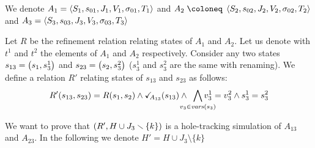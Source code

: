 \documentclass[runningheads]{llncs}
\begin{document}
We denote $A_1=  \left<S_1,s_{01},J_1,V_1,\sigma_{01},T_1\right>$ and \(A_2 \defobject \OA{S_2}{s_{02}}{J_2}{V_2}{\sigma_{02}}{T_2}\) and $A_3 = \left<S_3,s_{03},J_3,V_3,\sigma_{03},T_3\right>$

Let $R$ be the refinement relation relating states of $A_1$ and $A_2$. 
Let us denote with $t^1$ and $t^2$  the elements of $A_1$ and $A_2$ respectively.
Consider any two states $s_{13} = {\left(s_1,s^1_3\right)}$ and $s_{23} = {\left(s_2,s^2_3\right)}$ ($s^1_3$ and $s^2_3$  are the same with renaming). We define a relation $R'$ relating states of $s_{13}$ and $s_{23}$ as follows:
\[ R' \mpar{s_{13}, s_{23}} = R\mpar{s_{1}, s_{2}} \wedge \reach{A_{13}}\mpar{s_{13}} \wedge \bigwedge_\subbox{v_3\in \fvars{s_{3}}
}\!\!\! v^1_3=v^2_3\wedge s^1_3 = s^2_3\]


We want to prove that ${\left(R', H\cup J_3 \smallsetminus\{k\}\right)}$ is a hole-tracking simulation of $A_{13}$ and $A_{23}$. In the following we denote $H'=H\cup J_3 \setminus\{k\}$
\end{document}
